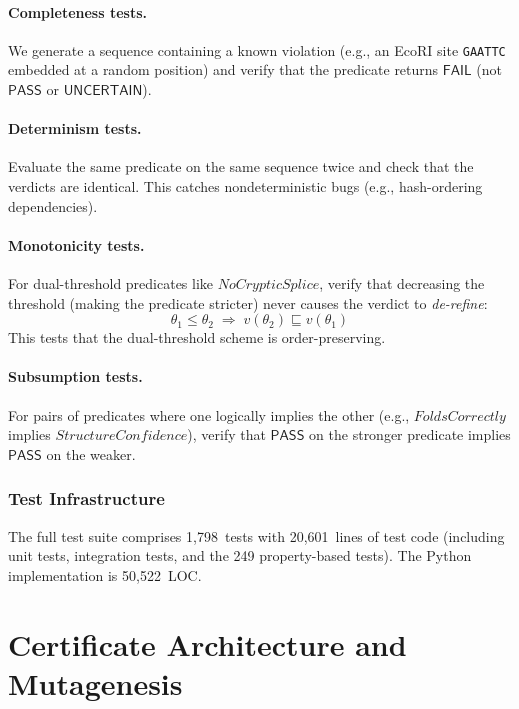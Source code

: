 \documentclass[acmsmall,review,anonymous]{acmart}
\newcommand{\PASS}{\ensuremath{\mathsf{PASS}}\xspace}
\newcommand{\FAIL}{\ensuremath{\mathsf{FAIL}}\xspace}
\newcommand{\UNCERTAIN}{\ensuremath{\mathsf{UNCERTAIN}}\xspace}
\newcommand{\verdict}{v}
\begin{document}
\paragraph{Completeness tests.}
We generate a sequence containing a known violation (e.g., an EcoRI
site \texttt{GAATTC} embedded at a random position) and verify that
the predicate returns \FAIL{} (not \PASS{} or \UNCERTAIN{}).

\paragraph{Determinism tests.}
Evaluate the same predicate on the same sequence twice and check that
the verdicts are identical.
This catches nondeterministic bugs (e.g., hash-ordering dependencies).

\paragraph{Monotonicity tests.}
For dual-threshold predicates like $\mathit{NoCrypticSplice}$, verify
that decreasing the threshold (making the predicate stricter) never
causes the verdict to \emph{de-refine}:
\[
  \theta_1 \le \theta_2 \;\Longrightarrow\;
  \verdict(\theta_2) \sqsubseteq \verdict(\theta_1)
\]
This tests that the dual-threshold scheme is order-preserving.

\paragraph{Subsumption tests.}
For pairs of predicates where one logically implies the other
(e.g., $\mathit{FoldsCorrectly}$ implies
$\mathit{StructureConfidence}$), verify that \PASS{} on the stronger
predicate implies \PASS{} on the weaker.

\subsubsection{Test Infrastructure}

The full test suite comprises 1{,}798~tests with 20{,}601~lines of
test code (including unit tests, integration tests, and the 249
property-based tests).
The Python implementation is 50{,}522~LOC.

\section{Certificate Architecture and Mutagenesis}\label{sec:cert-mut}
\end{document}
